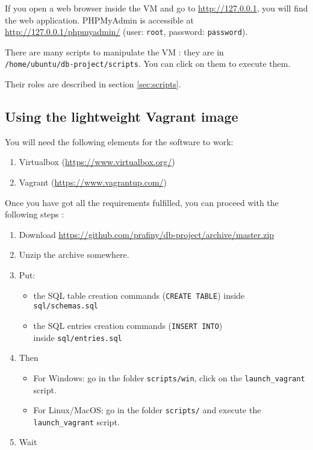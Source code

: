\documentclass[twoside,a4paper,12pt]{article}
\begin{document}
If you open a web browser inside the VM and go to \url{http://127.0.0.1}, you will find the web application. PHPMyAdmin is accessible at \url{http://127.0.0.1/phpmyadmin/} (user: \texttt{root}, password: \texttt{password}).

There are many scripts to manipulate the VM : they are in\\ \texttt{/home/ubuntu/db-project/scripts}. You can click on them to execute them.

Their roles are described in section \ref{sec:scripts}. 

\newpage
\subsection{Using the lightweight Vagrant image}
You will need the following elements for the software to work:
\begin{enumerate}
\item Virtualbox (\url{https://www.virtualbox.org/})
\item Vagrant (\url{https://www.vagrantup.com/})
\end{enumerate}

Once you have got all the requirements fulfilled, you can proceed with the following steps :

\begin{enumerate}
\item Download \url{https://github.com/prafiny/db-project/archive/master.zip}
\item Unzip the archive somewhere.
\item Put:
\begin{itemize}
	\item the SQL table creation commands (\texttt{CREATE TABLE}) inside \texttt{sql/schemas.sql}
	\item the SQL entries creation commands (\texttt{INSERT INTO})\\ inside \texttt{sql/entries.sql}
\end{itemize}
\item Then
\begin{itemize}
	\item For Windows: go in the folder \texttt{scripts/win}, click on the \texttt{launch\_vagrant} script.
	\item For Linux/MacOS: go in the folder \texttt{scripts/} and execute the \texttt{launch\_vagrant} script.
\end{itemize}
\item Wait
\end{enumerate}
\end{document}
